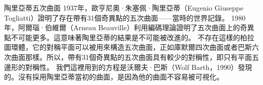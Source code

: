 \begin{surferPage}[陶里亞蒂五次曲面]{陶里亞蒂五次曲面}
1937年，歐亨尼奧·朱塞佩·陶里亞蒂（Eugenio Giuseppe Togliatti）證明了存在帶有31個奇異點的五次曲面——當時的世界記錄。
1980年，阿爾瑙·伯維爾（Arneau Beauville）利用編碼理論證明了五次曲面上的奇異點不可能更多。這意味著陶里亞蒂的結果是不可能被改進的。
不存在這樣的柏拉圖環體，它的對稱平面可以被用來構造五次曲面，正如庫默爾四次曲面或者巴斯六次曲面那樣。所以，帶有31個奇異點的五次曲面具有較少的對稱性，即只有平面五邊形的對稱性。
我們這裡用到的方程是沃爾夫·巴斯（Wolf Barth，1990）發現的。沒有採用陶里亞蒂當初的曲面，是因為他的曲面不容易被可視化。
\end{surferPage}

